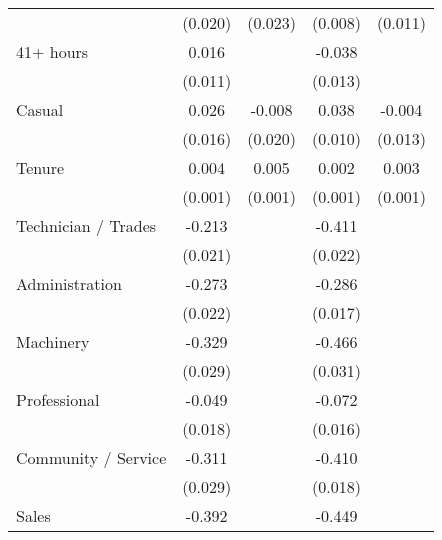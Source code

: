 {\begin{tabular}{l*{4}{c}}
                    &     (0.020)         &     (0.023)         &     (0.008)         &     (0.011)         \\
41+ hours           &       0.016         &                     &      -0.038\sym{***}&                     \\
                    &     (0.011)         &                     &     (0.013)         &                     \\
Casual              &       0.026         &      -0.008         &       0.038\sym{***}&      -0.004         \\
                    &     (0.016)         &     (0.020)         &     (0.010)         &     (0.013)         \\
Tenure              &       0.004\sym{***}&       0.005\sym{***}&       0.002\sym{***}&       0.003\sym{***}\\
                    &     (0.001)         &     (0.001)         &     (0.001)         &     (0.001)         \\
Technician / Trades &      -0.213\sym{***}&                     &      -0.411\sym{***}&                     \\
                    &     (0.021)         &                     &     (0.022)         &                     \\
Administration      &      -0.273\sym{***}&                     &      -0.286\sym{***}&                     \\
                    &     (0.022)         &                     &     (0.017)         &                     \\
Machinery           &      -0.329\sym{***}&                     &      -0.466\sym{***}&                     \\
                    &     (0.029)         &                     &     (0.031)         &                     \\
Professional        &      -0.049\sym{***}&                     &      -0.072\sym{***}&                     \\
                    &     (0.018)         &                     &     (0.016)         &                     \\
Community / Service &      -0.311\sym{***}&                     &      -0.410\sym{***}&                     \\
                    &     (0.029)         &                     &     (0.018)         &                     \\
Sales               &      -0.392\sym{***}&                     &      -0.449\sym{***}&                     \\

\end{tabular}}
